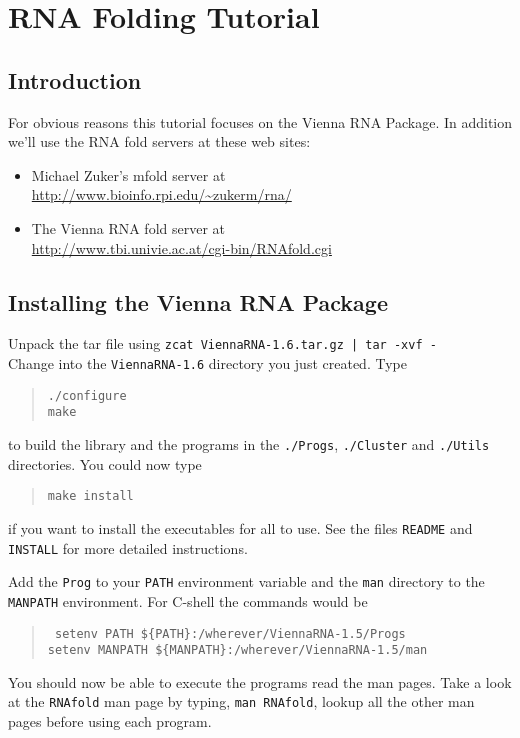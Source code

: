 \documentclass{article}
\begin{document}
\section{RNA Folding Tutorial}

\subsection{Introduction}

For obvious reasons this tutorial focuses on the Vienna RNA Package.
In addition we'll use the RNA fold servers at these web sites:
\begin{itemize}
\item Michael Zuker's mfold server at\\
\url{http://www.bioinfo.rpi.edu/~zukerm/rna/}
\item The Vienna RNA fold server at\\
\url{http://www.tbi.univie.ac.at/cgi-bin/RNAfold.cgi}
\end{itemize}

\subsection{Installing the Vienna RNA Package}

Unpack the tar file using {\tt zcat ViennaRNA-1.6.tar.gz | tar -xvf -}\\
Change into the {\tt ViennaRNA-1.6} directory you just created.
Type
\begin{quote}
\tt ./configure\\
make
\end{quote}
to build the library and the programs in the {\tt ./Progs}, {\tt ./Cluster}
and {\tt ./Utils} directories. You could now type
\begin{quote}
\tt make install
\end{quote}
if you want to install the executables for all to use.
See the files {\tt README} and {\tt INSTALL} for more detailed instructions. 

Add the {\tt Prog} to your {\tt PATH} environment variable and the {\tt man}
directory to the {\tt MANPATH} environment. For C-shell the commands would
be
\begin{quote}\tt
setenv PATH \$\{PATH\}:/wherever/ViennaRNA-1.5/Progs\\
setenv MANPATH \$\{MANPATH\}:/wherever/ViennaRNA-1.5/man
\end{quote}

You should now be able to execute the programs read the man pages. Take a
look at the {\tt RNAfold} man page by typing, {\tt man RNAfold}, lookup
all the other man pages before using each program.
\end{document}
